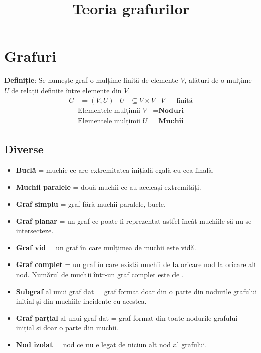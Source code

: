 \documentclass{article}
\title{Teoria grafurilor}
\author{}
\date{}
\begin{document}
\maketitle
\section*{Grafuri}
\textbf{Definiție}: Se numește graf o mulțime finită de elemente $V$, alături de o mulțime $U$ de relații definite între elemente din $V$.
\begin{align*}
    G &= (V, U) & U &\subseteq V\times V & V &- \text{finită}
\end{align*}
\begin{align*}
    \text{Elementele mulțimii }V &= \textbf{Noduri} \\
    \text{Elementele mulțimii }U &= \textbf{Muchii}
\end{align*}
\subsection*{Diverse}
\begin{itemize}
    \item \textbf{Buclă} = muchie ce are extremitatea inițială egală cu cea finală.
    \item \textbf{Muchii paralele} = două muchii ce au aceleași extremități.
    \item \textbf{Graf simplu} = graf fără muchii paralele, bucle.
    \item \textbf{Graf planar} = un graf ce poate fi reprezentat astfel încât muchiile să nu se intersecteze.
    \item \textbf{Graf vid} = un graf în care mulțimea de muchii este vidă.
    \item \textbf{Graf complet} = un graf în care există muchii de la oricare nod la oricare alt nod. Numărul de muchii într-un graf complet este de .
    \item \textbf{Subgraf} al unui graf dat = graf format doar din \underline{o parte din noduri}le grafului initial și din muchiile incidente cu acestea.
    \item \textbf{Graf parțial} al unui graf dat = graf format din toate nodurile grafului inițial și doar \underline{o parte din muchii}.
    \item \textbf{Nod izolat} = nod ce nu e legat de niciun alt nod al grafului.
\end{itemize}
\end{document}
